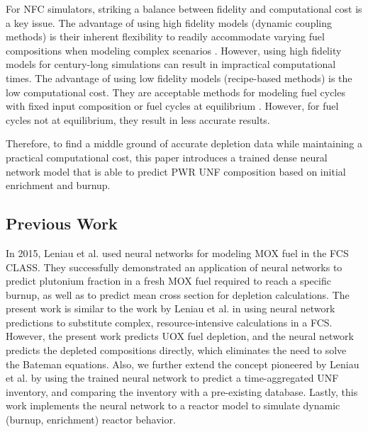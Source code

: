 For \gls{NFC} simulators, striking a balance between fidelity 
and computational cost is a key issue. 
The advantage of using high fidelity models (dynamic coupling 
methods) is their inherent flexibility 
to readily accommodate varying fuel compositions 
when modeling complex scenarios \cite{sunny_transition_2015}. 
However, using high fidelity models for century-long simulations 
can result in impractical computational times. 
The advantage of using low fidelity models (recipe-based methods)
is the low computational cost. 
They are acceptable methods for modeling fuel cycles with fixed input 
composition or fuel cycles at equilibrium \cite{sunny_transition_2015}. 
However, for fuel cycles not at equilibrium, they result in less 
accurate results. 

Therefore, to find a middle ground of accurate depletion data while 
maintaining a practical computational cost, this paper introduces 
a trained dense neural network model that is able to predict \gls{PWR} \gls{UNF}
composition based on initial enrichment and burnup. 

\subsection{Previous Work}
In 2015, Leniau et al. \cite{leniau_neural_2015} used neural networks
for modeling \gls{MOX} fuel in the \gls{FCS} CLASS. They successfully
demonstrated an application of neural networks to predict plutonium
fraction in a fresh \gls{MOX} fuel required to reach a specific burnup,
as well as to predict mean cross section for depletion calculations.
The present work is similar to the work by Leniau et al. in using
neural network predictions to substitute complex, resource-intensive
calculations in a \gls{FCS}. However, the present work predicts
\gls{UOX} fuel depletion, and the neural network predicts the depleted
compositions directly, which eliminates the need to solve the Bateman
equations. Also, we further extend the concept pioneered by
Leniau et al. by using the trained neural network
to predict a time-aggregated \gls{UNF} inventory, and comparing
the inventory with a pre-existing database. Lastly, this work
implements the neural network to a reactor model to
simulate dynamic (burnup, enrichment) reactor behavior.



\subsection{\Cyclus}

